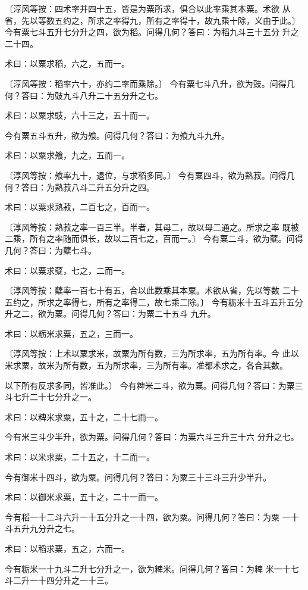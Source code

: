 \documentclass[a4paper,12pt,UTF8,twoside]{ctexbook}
\begin{document}
〔淳风等按：四术率并四十五，皆是为粟所求，俱合以此率乘其本粟。术欲 从省，先以等数五约之，所求之率得九，所有之率得十，故九乘十除，义由于此。〕 今有粟七斗五升七分升之四，欲为稻。问得几何？答曰：为稻九斗三十五分 升之二十四。

术曰：以粟求稻，六之，五而一。

〔淳风等按：稻率六十，亦约二率而乘除。〕 今有粟七斗八升，欲为豉。问得几何？答曰：为豉九斗八升二十五分升之七。

术曰：以粟求豉，六十三之，五十而一。

今有粟五斗五升，欲为飧。问得几何？答曰：为飧九斗九升。

术曰：以粟求飧，九之，五而一。

〔淳风等按：飧率九十，退位，与求稻多同。〕 今有粟四斗，欲为熟菽。问得几何？答曰：为熟菽八斗二升五分升之四。

术曰：以粟求熟菽，二百七之，百而一。

〔淳风等按：熟菽之率一百三半。半者，其母二，故以母二通之。所求之率 既被二乘，所有之率随而俱长，故以二百七之，百而一。〕 今有粟二斗，欲为糵。问得几何？答曰：为糵七斗。

术曰：以粟求糵，七之，二而一。

〔淳风等按：糵率一百七十有五，合以此数乘其本粟。术欲从省，先以等数 二十五约之，所求之率得七，所有之率得二，故七乘二除。〕 今有粝米十五斗五升五分升之二，欲为粟。问得几何？答曰：为粟二十五斗 九升。

术曰：以粝米求粟，五之，三而一。

〔淳风等按：上术以粟求米，故粟为所有数，三为所求率，五为所有率。今 此以米求粟，故米为所有数，五为所求率，三为所有率。准都术求之，各合其数。

以下所有反求多同，皆准此。〕 今有粺米二斗，欲为粟。问得几何？答曰：为粟三斗七升二十七分升之一。

术曰：以粺米求粟，五十之，二十七而一。

今有米三斗少半升，欲为粟。问得几何？答曰：为粟六斗三升三十六 分升之七。

术曰：以米求粟，二十五之，十二而一。

今有御米十四斗，欲为粟。问得几何？答曰：为粟三十三斗三升少半升。

术曰：以御米求粟，五十之，二十一而一。

今有稻一十二斗六升一十五分升之一十四，欲为粟。问得几何？答曰：为粟 一十斗五升九分升之七。

术曰：以稻求粟，五之，六而一。

今有粝米一十九斗二升七分升之一，欲为粺米。问得几何？答曰：为粺 米一十七斗二升一十四分升之一十三。
\end{document}
